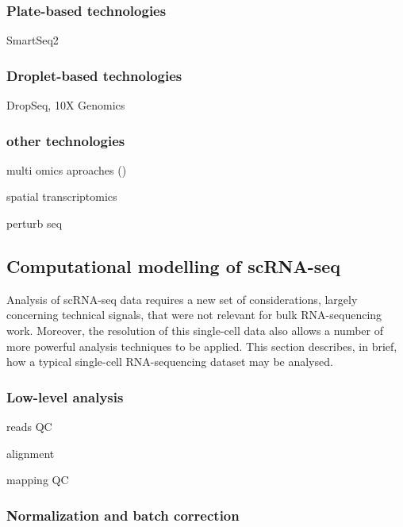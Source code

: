 \subsubsection{Plate-based technologies}

SmartSeq2

\subsubsection{Droplet-based technologies}

DropSeq, 10X Genomics

\subsubsection{other technologies}

multi omics aproaches (\cite{stuart2019integrative})

spatial transcriptomics

perturb seq


\subsection{Computational modelling of scRNA-seq}

Analysis of scRNA-seq data requires a new set of considerations, largely concerning technical signals, that were not relevant for bulk RNA-sequencing work. 
Moreover, the resolution of this single-cell data also allows a number of more powerful analysis techniques to be applied.
This section describes, in brief, how a typical single-cell RNA-sequencing dataset may be analysed.

\cite{stegle2015computational}

\subsubsection{Low-level analysis}

reads QC 

alignment

mapping QC

\subsubsection{Normalization and batch correction}

